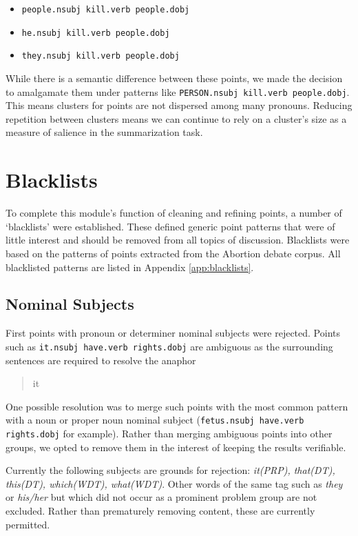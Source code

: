     \begin{itemize}
      \item{\texttt{people.nsubj kill.verb people.dobj}}
      \item{\texttt{he.nsubj kill.verb people.dobj}}
      \item{\texttt{they.nsubj kill.verb people.dobj}}
    \end{itemize}

    While there is a semantic difference between these points, we made the decision to amalgamate them under patterns like \texttt{PERSON.nsubj kill.verb people.dobj}. This means clusters for points are not dispersed among many pronouns. Reducing repetition between clusters means we can continue to rely on a cluster's size as a measure of salience in the summarization task.

  \section{Blacklists}
    To complete this module's function of cleaning and refining points, a number of `blacklists' were established. These defined generic point patterns that were of little interest and should be removed from all topics of discussion. Blacklists were based on the patterns of points extracted from the Abortion debate corpus. All blacklisted patterns are listed in Appendix \ref{app:blacklists}.

    \tocless\subsection{Nominal Subjects}
    First points with pronoun or determiner nominal subjects were rejected. Points such as \texttt{it.nsubj have.verb rights.dobj} are ambiguous as the surrounding sentences are required to resolve the anaphor \blockquote{it}. One possible resolution was to merge such points with the most common pattern with a noun or proper noun nominal subject (\texttt{fetus.nsubj have.verb rights.dobj} for example). Rather than merging ambiguous points into other groups, we opted to remove them in the interest of keeping the results verifiable.

      Currently the following subjects are grounds for rejection: \textit{it(PRP), that(DT), this(DT), which(WDT), what(WDT)}. Other words of the same tag such as \textit{they} or \textit{his/her} but which did not occur as a prominent problem group are not excluded. Rather than prematurely removing content, these are currently permitted.

